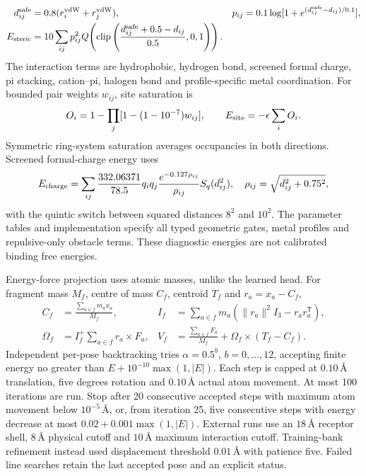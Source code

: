 \begin{align}
 d_{ij}^{\rm safe}&=0.8(r_i^{\rm vdW}+r_j^{\rm vdW}),&
 p_{ij}&=0.1\log[1+e^{(d_{ij}^{\rm safe}-d_{ij})/0.1}],\\
 E_{\rm steric}&=10\sum_{ij}p_{ij}^2
 Q\!\left(\operatorname{clip}\left(\frac{d_{ij}^{\rm safe}+0.5-d_{ij}}{0.5},0,1\right)\right).
\end{align}
The interaction terms are hydrophobic, hydrogen bond, screened formal charge,
pi stacking, cation--pi, halogen bond and profile-specific metal coordination.
For bounded pair weights $w_{ij}$, site saturation is
\begin{equation}
 O_i=1-\prod_j[1-(1-10^{-7})w_{ij}],\qquad E_{\rm site}=-\epsilon\sum_iO_i.
\end{equation}
Symmetric ring-system saturation averages occupancies in both directions.
Screened formal-charge energy uses
\begin{equation}
 E_{\rm charge}=\sum_{ij}\frac{332.06371}{78.5}q_iq_j
 \frac{e^{-0.127\rho_{ij}}}{\rho_{ij}}S_q(d_{ij}^2),\quad
 \rho_{ij}=\sqrt{d_{ij}^2+0.75^2},
\end{equation}
with the quintic switch between squared distances $8^2$ and $10^2$.
The parameter tables and implementation specify all typed geometric gates,
metal profiles and repulsive-only obstacle terms. These diagnostic energies
are not calibrated binding free energies.

Energy-force projection uses atomic masses, unlike the learned head. For
fragment mass $M_f$, centre of mass $C_f$, centroid $T_f$ and $r_a=x_a-C_f$,
\begin{align}
 C_f&=\frac{\sum_{a\in f}m_ax_a}{M_f},&
 I_f&=\sum_{a\in f}m_a(\|r_a\|^2I_3-r_ar_a^{\mathsf T}),\\
 \Omega_f&=I_f^+\sum_{a\in f}r_a\times F_a,&
 V_f&=\frac{\sum_{a\in f}F_a}{M_f}+\Omega_f\times(T_f-C_f).
 \label{eq:effdock-energy-projection}
\end{align}
Independent per-pose backtracking tries $\alpha=0.5^b$, $b=0,\ldots,12$,
accepting finite energy no greater than
$E+10^{-10}\max(1,|E|)$. Each step is capped at $0.10\,\text{\AA}$
translation, five degrees rotation and $0.10\,\text{\AA}$ actual atom
movement. At most 100 iterations are run. Stop after 20 consecutive accepted
steps with maximum atom movement below $10^{-5}\,\text{\AA}$, or, from
iteration 25, five consecutive steps with energy decrease at most
$0.02+0.001\max(1,|E|)$. External runs use an $18\,\text{\AA}$ receptor
shell, $8\,\text{\AA}$ physical cutoff and $10\,\text{\AA}$ maximum
interaction cutoff. Training-bank refinement instead used displacement
threshold $0.01\,\text{\AA}$ with patience five. Failed line searches retain
the last accepted pose and an explicit status.

